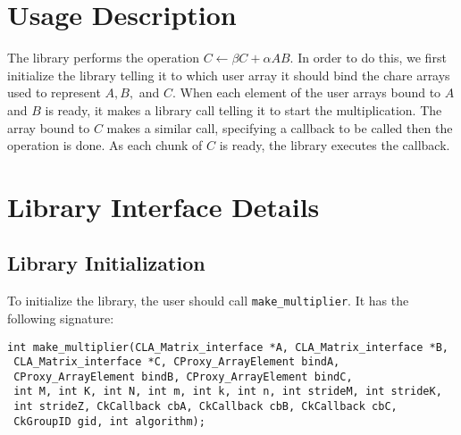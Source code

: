 \section{Usage Description}
The library performs the operation $C \leftarrow \beta C + \alpha AB$. In
order to do
this, we first initialize the library telling it to which user array it should
bind the chare arrays used to represent $A, B,$ and $C$. When each element of
the user arrays bound to $A$ and $B$ is ready, it makes a library call telling
it to start the multiplication. The array bound to $C$ makes a similar call,
specifying a callback to be called then the operation is done. As each chunk
of $C$ is ready, the library executes the callback.

\section{Library Interface Details}

\subsection{Library Initialization}

To initialize the library, the user should call {\tt make\_multiplier}. It
has the following signature:
\begin{verbatim}
int make_multiplier(CLA_Matrix_interface *A, CLA_Matrix_interface *B,
 CLA_Matrix_interface *C, CProxy_ArrayElement bindA,
 CProxy_ArrayElement bindB, CProxy_ArrayElement bindC,
 int M, int K, int N, int m, int k, int n, int strideM, int strideK,
 int strideZ, CkCallback cbA, CkCallback cbB, CkCallback cbC,
 CkGroupID gid, int algorithm);
\end{verbatim}

